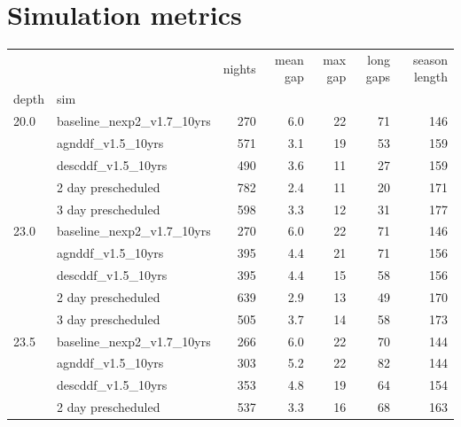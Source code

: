 \documentclass[DM,authoryear,toc]{lsstdoc}
\begin{document}
\section{Simulation metrics}


\begin{table}[t]
  \centering
  \begin{tabular}{llrrrrr}
    \hline
         &                   &  nights  &  mean gap &  max gap &  long gaps &  season length \\
   depth & sim &             &           &          &            &                \\
    \hline
20.0 & baseline\_nexp2\_v1.7\_10yrs &         270 &       6.0 &       22 &         71 &            146 \\
     & agnddf\_v1.5\_10yrs &         571 &       3.1 &       19 &         53 &            159 \\
     & descddf\_v1.5\_10yrs &         490 &       3.6 &       11 &         27 &            159 \\
     & 2 day prescheduled &         782 &       2.4 &       11 &         20 &            171 \\
     & 3 day prescheduled &         598 &       3.3 &       12 &         31 &            177 \\
\hline
23.0 & baseline\_nexp2\_v1.7\_10yrs &         270 &       6.0 &       22 &         71 &            146 \\
     & agnddf\_v1.5\_10yrs &         395 &       4.4 &       21 &         71 &            156 \\
     & descddf\_v1.5\_10yrs &         395 &       4.4 &       15 &         58 &            156 \\
     & 2 day prescheduled &         639 &       2.9 &       13 &         49 &            170 \\
     & 3 day prescheduled &         505 &       3.7 &       14 &         58 &            173 \\
\hline
23.5 & baseline\_nexp2\_v1.7\_10yrs &         266 &       6.0 &       22 &         70 &            144 \\
     & agnddf\_v1.5\_10yrs &         303 &       5.2 &       22 &         82 &            144 \\
     & descddf\_v1.5\_10yrs &         353 &       4.8 &       19 &         64 &            154 \\
     & 2 day prescheduled &         537 &       3.3 &       16 &         68 &            163 \\

\end{tabular}
\end{table}
\end{document}
